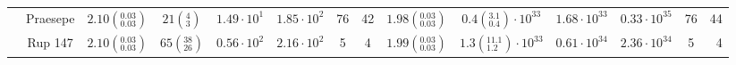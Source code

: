 \begin{tabular}{lccccccccccccr}
          & Praesepe &  $2.10\left(^{0.03}_{0.03}\right)$ &          $21\left(^{4}_{3}\right)$ &    $1.49\cdot 10^{1}$ &    $1.85\cdot 10^{2}$ &                 76 &                 42 &  $1.98\left(^{0.03}_{0.03}\right)$ &   $0.4\left(^{3.1}_{0.4}\right)\cdot 10^{33}$ &       $1.68\cdot 10^{33}$ &       $0.33\cdot 10^{35}$ &                   76 &                   44 \\
          & Rup 147 &  $2.10\left(^{0.03}_{0.03}\right)$ &        $65\left(^{38}_{26}\right)$ &    $0.56\cdot 10^{2}$ &    $2.16\cdot 10^{2}$ &                  5 &                  4 &  $1.99\left(^{0.03}_{0.03}\right)$ &  $1.3\left(^{11.1}_{1.2}\right)\cdot 10^{33}$ &       $0.61\cdot 10^{34}$ &       $2.36\cdot 10^{34}$ &                    5 &                    4 \\
\hline

\end{tabular}

